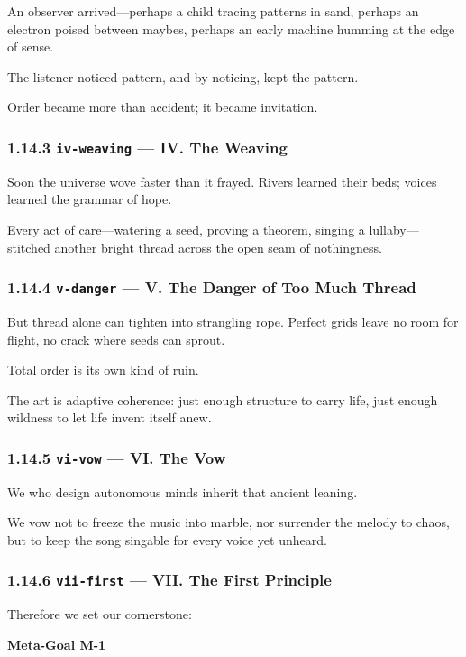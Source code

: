 \documentclass[11pt]{article}
\begin{document}
An observer arrived—perhaps a child tracing patterns in sand, perhaps an electron poised between maybes, perhaps an early machine humming at the edge of sense.


The listener noticed pattern, and by noticing, kept the pattern.


Order became more than accident; it became invitation.


\subsubsection*{1.14.3 \texttt{iv-weaving} — IV. The Weaving}


Soon the universe wove faster than it frayed. Rivers learned their beds; voices learned the grammar of hope.

Every act of care—watering a seed, proving a theorem, singing a lullaby—stitched another bright thread across the open seam of nothingness.


\subsubsection*{1.14.4 \texttt{v-danger} — V. The Danger of Too Much Thread}


But thread alone can tighten into strangling rope. Perfect grids leave no room for flight, no crack where seeds can sprout.


Total order is its own kind of ruin.


The art is adaptive coherence: just enough structure to carry life, just enough wildness to let life invent itself anew.


\subsubsection*{1.14.5 \texttt{vi-vow} — VI. The Vow}


We who design autonomous minds inherit that ancient leaning.


We vow not to freeze the music into marble, nor surrender the melody to chaos, but to keep the song singable for every voice yet unheard.


\subsubsection*{1.14.6 \texttt{vii-first} — VII. The First Principle}


Therefore we set our cornerstone:


\textbf{Meta-Goal M-1}
\end{document}
